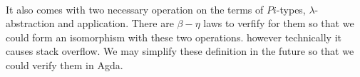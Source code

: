 {\begin{code}
\>[50]\<%
\\
\>[0]\<[13]%
\>[13]\AgdaSymbol{(}\AgdaFunction{[}  \AgdaFunction{]subst*} \AgdaSymbol{\_} \AgdaSymbol{(} \AgdaSymbol{\_} \AgdaSymbol{\_} \<[37]%
\>[37]\<%
\\
\>[0]\<[13]%
\>[13]\AgdaSymbol{(}\AgdaFunction{[} \AgdaFunction{[}  \AgdaFunction{]fm} \AgdaSymbol{\_} \AgdaFunction{]trans} \<[33]%
\>[33]\<%
\\
\>[0]\<[13]%
\>[13]\AgdaSymbol{(}\AgdaFunction{[}  \AgdaFunction{]trans*} \AgdaSymbol{\_} \AgdaSymbol{\_} \AgdaSymbol{\_)} \AgdaFunction{[}  \AgdaFunction{]subst-pi}\AgdaSymbol{)))} \AgdaSymbol{\}} \<[52]%
\>[52]\<%
\\
\>[0]\<[2]%
\>[2]\AgdaSymbol{\}}\<%
\\
%
\\
\>\<\end{code}
}

It also comes with two necessary operation on the terms of $Pi$-types, $\lambda$-abstraction and application.
There are $\beta-\eta$ laws to verfify for them so that we could form an isomorphism with these two operations. however technically it causes stack overflow. We may simplify these definition in the future so that we could verify them in Agda.


\begin{code}\>\<%
\\
%
\\
\> \AgdaSymbol{:} \AgdaSymbol{\{} \AgdaSymbol{:} \AgdaSymbol{\}\{} \AgdaSymbol{:}  \AgdaSymbol{\}\{} \AgdaSymbol{:}  \AgdaSymbol{(} \AgdaFunction{\&} \AgdaSymbol{)\}}      \AgdaSymbol{(}  \AgdaSymbol{)}\<%
\\
\>\<\end{code}

